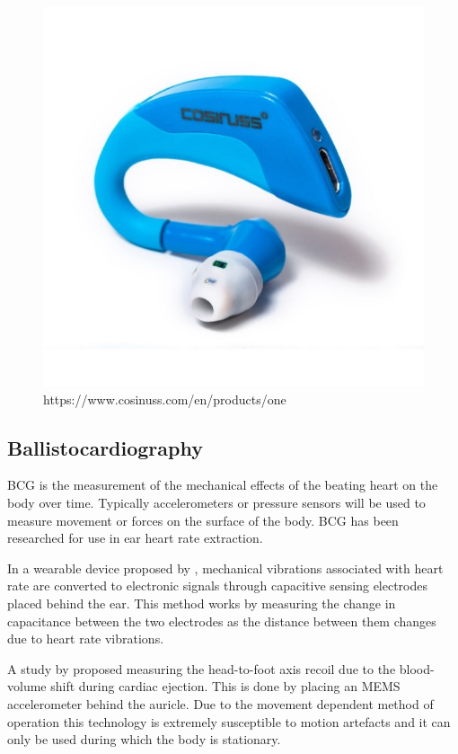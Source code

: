 \begin{figure}[h]
   \centering
   \includegraphics[scale=0.8]{figs/cosinuss}
   \caption{https://www.cosinuss.com/en/products/one}
   \label{fig:cosinuss}
\end{figure}


\subsection{Ballistocardiography}
BCG is the measurement of the mechanical effects of the beating heart on the body over time. Typically accelerometers or pressure sensors will be used to measure movement or forces on the surface of the body. BCG has been researched for use in ear heart rate extraction.

\medskip
In a wearable device proposed by \cite{da2010ear}, mechanical vibrations associated with heart rate are converted to electronic signals through capacitive sensing electrodes placed behind the ear. This method works by measuring the change in capacitance between the two electrodes as the distance between them changes due to heart rate vibrations.

\medskip
A study by \cite{winokur2012wearable} proposed measuring the head-to-foot axis recoil due to the blood-volume shift during cardiac ejection. This is done by placing an MEMS accelerometer behind the auricle. Due to the movement dependent method of operation this technology is extremely susceptible to motion artefacts and it can only be used during which the body is stationary.

